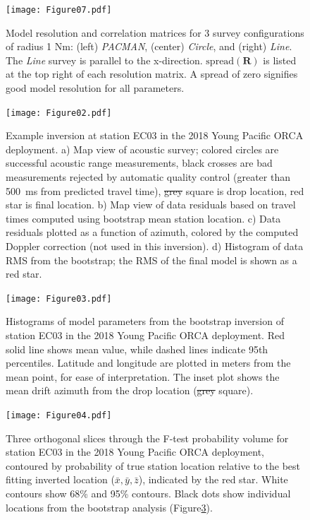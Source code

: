 \documentclass[10pt,titlepage]{article}
\providecommand{\DIFaddtex}[1]{{\protect\color{blue}\uwave{#1}}} %
\providecommand{\DIFdeltex}[1]{{\protect\color{red}\sout{#1}}}                      %
\providecommand{\DIFaddFL}[1]{\DIFadd{#1}} %
\providecommand{\DIFdelFL}[1]{\DIFdel{#1}} %
\providecommand{\DIFaddbeginFL}{} %
\providecommand{\DIFaddendFL}{} %
\providecommand{\DIFdelbeginFL}{} %
\providecommand{\DIFdelendFL}{} %
\providecommand{\DIFadd}[1]{\texorpdfstring{\DIFaddtex{#1}}{#1}} %
\providecommand{\DIFdel}[1]{\texorpdfstring{\DIFdeltex{#1}}{}} %
\begin{document}
\begin{figure}
[h]
\texttt{[image: Figure07.pdf]}
\caption{ Model resolution and correlation matrices for 3 survey configurations of radius 1 Nm: (left) \textit{PACMAN}, (center) \textit{Circle}, and (right) \textit{Line}. The \textit{Line} survey is parallel to the x-direction. $\text{spread}(\mathbf{R})$ is listed at the top right of each resolution matrix. A spread of zero signifies good model resolution for all parameters.}
\label{fig:resolution_correlation}
\end{figure}
\newpage

\begin{figure}
[h]
\texttt{[image: Figure02.pdf]}
\caption{Example inversion at station EC03 in the 2018 Young Pacific ORCA deployment. a) Map view of acoustic survey; colored circles are successful acoustic range measurements, black crosses are bad measurements rejected by automatic quality control (greater than 500~ms from predicted travel time), \DIFdelbeginFL \DIFdelFL{grey }\DIFdelendFL \DIFaddbeginFL \DIFaddFL{gray }\DIFaddendFL square is drop location, red star is final location. b) Map view of data residuals based on travel times computed using bootstrap mean station location. c) Data residuals plotted as a function of azimuth, colored by the computed Doppler correction (not used in this inversion). d) Histogram of data RMS from the bootstrap; the RMS of the final model is shown as a red star.}
\label{fig:one_sta_real_survey}
\end{figure}
\newpage

\begin{figure}
[h]
\texttt{[image: Figure03.pdf]}
\caption{Histograms of model parameters from the bootstrap inversion of station EC03 in the 2018 Young Pacific ORCA deployment. Red solid line shows mean value, while dashed lines indicate 95th percentiles. Latitude and longitude are plotted in meters from the mean point, for ease of interpretation. The inset plot shows the mean drift azimuth from the drop location (\DIFdelbeginFL \DIFdelFL{grey }\DIFdelendFL \DIFaddbeginFL \DIFaddFL{gray }\DIFaddendFL square).}
\label{fig:one_sta_real_histograms}
\end{figure}
\newpage

\begin{figure}
[h]
\texttt{[image: Figure04.pdf]}
\caption{ Three orthogonal slices through the F-test probability volume for station EC03 in the 2018 Young Pacific ORCA deployment, contoured by probability of true station location relative to the best fitting inverted location ($\bar{x},\bar{y},\bar{z}$), indicated by the red star. White contours show 68\% and 95\% contours. Black dots show individual locations from the bootstrap analysis (Figure\DIFaddbeginFL \DIFaddFL{~}\DIFaddendFL \ref{fig:one_sta_real_histograms}).}
\label{fig:one_sta_real_ftests}
\end{figure}
\newpage
\end{document}
